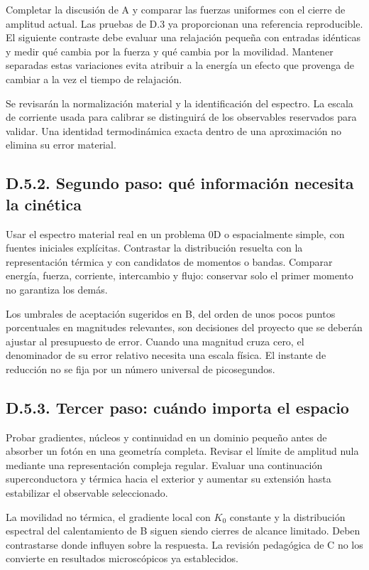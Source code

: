 \documentclass[
  spanish,
  10pt,
  a4paper,
]{article}
\begin{document}
Completar la discusión de A y comparar las fuerzas uniformes con el
cierre de amplitud actual. Las pruebas de D.3 ya proporcionan una
referencia reproducible. El siguiente contraste debe evaluar una
relajación pequeña con entradas idénticas y medir qué cambia por la
fuerza y qué cambia por la movilidad. Mantener separadas estas
variaciones evita atribuir a la energía un efecto que provenga de
cambiar a la vez el tiempo de relajación.

Se revisarán la normalización material y la identificación del espectro.
La escala de corriente usada para calibrar se distinguirá de los
observables reservados para validar. Una identidad termodinámica exacta
dentro de una aproximación no elimina su error material.

\subsection{D.5.2. Segundo paso: qué información necesita la
cinética}\label{d.5.2.-segundo-paso-quuxe9-informaciuxf3n-necesita-la-cinuxe9tica}

Usar el espectro material real en un problema 0D o espacialmente simple,
con fuentes iniciales explícitas. Contrastar la distribución resuelta
con la representación térmica y con candidatos de momentos o bandas.
Comparar energía, fuerza, corriente, intercambio y flujo: conservar solo
el primer momento no garantiza los demás.

Los umbrales de aceptación sugeridos en B, del orden de unos pocos
puntos porcentuales en magnitudes relevantes, son decisiones del
proyecto que se deberán ajustar al presupuesto de error. Cuando una
magnitud cruza cero, el denominador de su error relativo necesita una
escala física. El instante de reducción no se fija por un número
universal de picosegundos.

\subsection{D.5.3. Tercer paso: cuándo importa el
espacio}\label{d.5.3.-tercer-paso-cuuxe1ndo-importa-el-espacio}

Probar gradientes, núcleos y continuidad en un dominio pequeño antes de
absorber un fotón en una geometría completa. Revisar el límite de
amplitud nula mediante una representación compleja regular. Evaluar una
continuación superconductora y térmica hacia el exterior y aumentar su
extensión hasta estabilizar el observable seleccionado.

La movilidad no térmica, el gradiente local con \(K_0\) constante y la
distribución espectral del calentamiento de B siguen siendo cierres de
alcance limitado. Deben contrastarse donde influyen sobre la respuesta.
La revisión pedagógica de C no los convierte en resultados microscópicos
ya establecidos.
\end{document}
